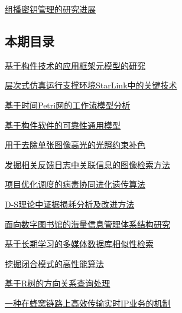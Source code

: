\documentclass[a4paper]{article}
\begin{document}
\href{http://www.jos.org.cn/ch/reader/download_pdf.aspx?file_no=20040117&year_id=2004&quarter_id=1&falg=1}{组播密钥管理的研究进展}

\subsection{本期目录}
\href{http://www.jos.org.cn/ch/reader/download_pdf.aspx?file_no=20040101&year_id=2004&quarter_id=1&falg=1}{基于构件技术的应用框架元模型的研究}

\href{http://www.jos.org.cn/ch/reader/download_pdf.aspx?file_no=20040102&year_id=2004&quarter_id=1&falg=1}{层次式仿真运行支撑环境StarLink中的关键技术}

\href{http://www.jos.org.cn/ch/reader/download_pdf.aspx?file_no=20040103&year_id=2004&quarter_id=1&falg=1}{基于时间Petri网的工作流模型分析}

\href{http://www.jos.org.cn/ch/reader/download_pdf.aspx?file_no=20040104&year_id=2004&quarter_id=1&falg=1}{基于构件软件的可靠性通用模型}

\href{http://www.jos.org.cn/ch/reader/download_pdf.aspx?file_no=20040105&year_id=2004&quarter_id=1&falg=1}{用于去除单张图像高光的光照约束补色}

\href{http://www.jos.org.cn/ch/reader/download_pdf.aspx?file_no=20040106&year_id=2004&quarter_id=1&falg=1}{发掘相关反馈日志中关联信息的图像检索方法}

\href{http://www.jos.org.cn/ch/reader/download_pdf.aspx?file_no=20040107&year_id=2004&quarter_id=1&falg=1}{项目优化调度的病毒协同进化遗传算法}

\href{http://www.jos.org.cn/ch/reader/download_pdf.aspx?file_no=20040109&year_id=2004&quarter_id=1&falg=1}{D-S理论中证据损耗分析及改进方法}

\href{http://www.jos.org.cn/ch/reader/download_pdf.aspx?file_no=20040110&year_id=2004&quarter_id=1&falg=1}{面向数字图书馆的海量信息管理体系结构研究}

\href{http://www.jos.org.cn/ch/reader/download_pdf.aspx?file_no=20040111&year_id=2004&quarter_id=1&falg=1}{基于长期学习的多媒体数据库相似性检索}

\href{http://www.jos.org.cn/ch/reader/download_pdf.aspx?file_no=20040112&year_id=2004&quarter_id=1&falg=1}{挖掘闭合模式的高性能算法}

\href{http://www.jos.org.cn/ch/reader/download_pdf.aspx?file_no=20040113&year_id=2004&quarter_id=1&falg=1}{基于R树的方向关系查询处理}

\href{http://www.jos.org.cn/ch/reader/download_pdf.aspx?file_no=20040114&year_id=2004&quarter_id=1&falg=1}{一种在蜂窝链路上高效传输实时IP业务的机制}
\end{document}
